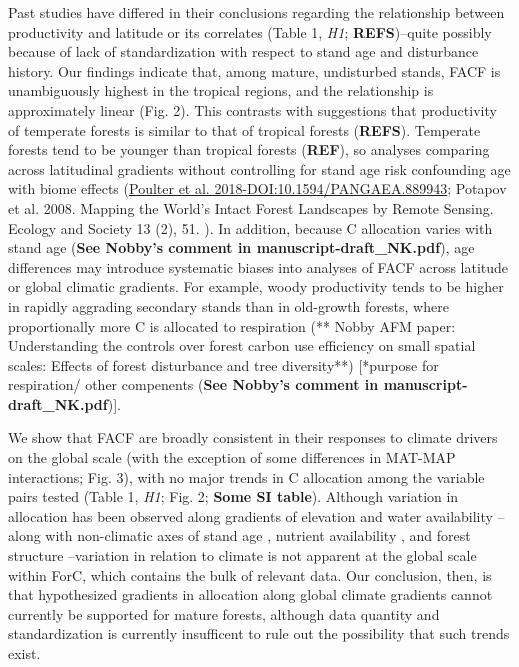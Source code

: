 \documentclass[]{article}
\begin{document}
Past studies have differed in their conclusions regarding the
relationship between productivity and latitude or its correlates (Table
1, \emph{H1}; \textbf{REFS})--quite possibly because of lack of
standardization with respect to stand age and disturbance history. Our
findings indicate that, among mature, undisturbed stands, FACF is
unambiguously highest in the tropical regions, and the relationship is
approximately linear (Fig. 2). This contrasts with suggestions that
productivity of temperate forests is similar to that of tropical forests
(\textbf{REFS}). Temperate forests tend to be younger than tropical
forests (\textbf{REF}), so analyses comparing across latitudinal
gradients without controlling for stand age risk confounding age with
biome effects (\href{http://pure.iiasa.ac.at/id/eprint/15361/}{Poulter
et al. 2018-DOI:10.1594/PANGAEA.889943}; Potapov et al. 2008. Mapping
the World's Intact Forest Landscapes by Remote Sensing. Ecology and
Society 13 (2), 51. ). In addition, because C allocation varies with
stand age \citep{de_lucia_forest_2007} (\textbf{See Nobby's comment in
manuscript-draft\_NK.pdf}), age differences may introduce systematic
biases into analyses of FACF across latitude or global climatic
gradients. For example, woody productivity tends to be higher in rapidly
aggrading secondary stands than in old-growth forests, where
proportionally more C is allocated to respiration (** Nobby AFM paper:
Understanding the controls over forest carbon use efficiency on small
spatial scales: Effects of forest disturbance and tree diversity**)
{[}*purpose for respiration/ other compenents (\textbf{See Nobby's
comment in manuscript-draft\_NK.pdf}){]}.

We show that FACF are broadly consistent in their responses to climate
drivers on the global scale (with the exception of some differences in
MAT-MAP interactions; Fig. 3), with no major trends in C allocation
among the variable pairs tested (Table 1, \emph{H1}; Fig. 2;
\textbf{Some SI table}). Although variation in allocation has been
observed along gradients of elevation \citep{moser_elevation_2011} and
water availability \citep{newman_above-_2006}--along with non-climatic
axes of stand age \citep{litton_carbon_2007}, nutrient availability
\citep{litton_carbon_2007, gill_belowground_2016}, and forest structure
\citep{taylor_greater_2019}--variation in relation to climate is not
apparent at the global scale within ForC, which contains the bulk of
relevant data. Our conclusion, then, is that hypothesized gradients in
allocation along global climate gradients cannot currently be supported
for mature forests, although data quantity and standardization is
currently insufficent to rule out the possibility that such trends
exist.
\end{document}
